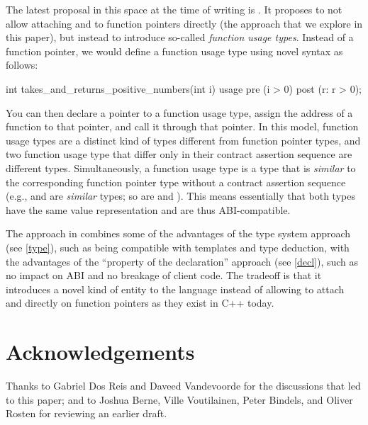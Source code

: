 The latest proposal in this space at the time of writing is \cite{P3271R0}. It proposes to not allow attaching  and  to function pointers directly (the approach that we explore in this paper), but instead to introduce so-called \emph{function usage types}. Instead of a function pointer, we would define a function usage type using novel syntax as follows:
\begin{codeblock}
int takes_and_returns_positive_numbers(int i) usage 
  pre (i > 0)
  post (r: r > 0);
\end{codeblock}
You can then declare a pointer to a function usage type, assign the address of a function to that pointer, and call it through that pointer. In this model, function usage types are a distinct kind of types different from function pointer types, and two function usage type that differ only in their contract assertion sequence are different types. Simultaneously, a function usage type is a type that is \emph{similar} to the corresponding function pointer type without a contract assertion sequence (e.g.,  and  are \emph{similar} types; so are  and ). This means essentially that both types have the same value representation and are thus ABI-compatible.

The approach in \cite{P3271R0} combines some of the advantages of the type system approach (see \ref{type}), such as being compatible with templates and type deduction, with the advantages of the ``property of the declaration'' approach (see \ref{decl}), such as no impact on ABI and no breakage of client code. The tradeoff is that it introduces a novel kind of entity to the language instead of allowing to attach  and  directly on function pointers as they exist in C++ today.


\section*{Acknowledgements}

Thanks to Gabriel Dos Reis and Daveed Vandevoorde for the discussions that led to this paper; and to Joshua Berne, Ville Voutilainen, Peter Bindels, and Oliver Rosten for reviewing an earlier draft.


\renewcommand{\addcontentsline}[3]{}%








